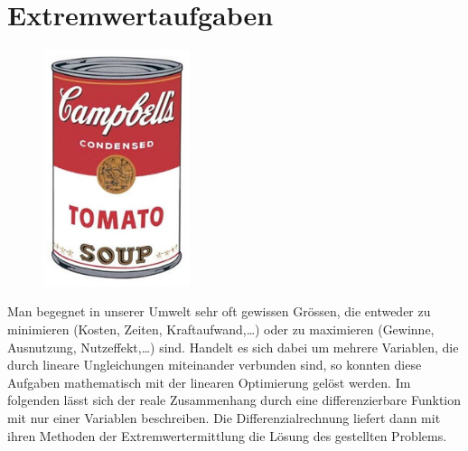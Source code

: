 \documentclass[%
11pt,%
twoside,%
titlepage,%
german,%
headsepline%
]{scrartcl}
\theoremstyle{definition}
\theoremstyle{plain}
\begin{document}
\clearpage

\section{Extremwertaufgaben}

\begin{figure}
\vspace{-22pt}
  \begin{center}
    \includegraphics[width=0.382\textwidth]{pictures/can}
  \end{center}
\vspace{-10pt}
\end{figure}
Man begegnet in unserer Umwelt sehr oft gewissen Grössen, die entweder zu minimieren (Kosten, Zeiten, Kraftaufwand,\dots) oder zu maximieren (Gewinne, Ausnutzung, Nutzeffekt,\dots) sind. Handelt es sich dabei um mehrere Variablen, die durch lineare Ungleichungen miteinander verbunden sind, so konnten diese Aufgaben mathematisch mit der linearen Optimierung gelöst werden. Im folgenden lässt sich der reale Zusammenhang durch eine differenzierbare Funktion mit nur einer Variablen beschreiben. Die Differenzialrechnung liefert dann mit ihren Methoden der Extremwertermittlung die Lösung des gestellten Problems.
\end{document}
